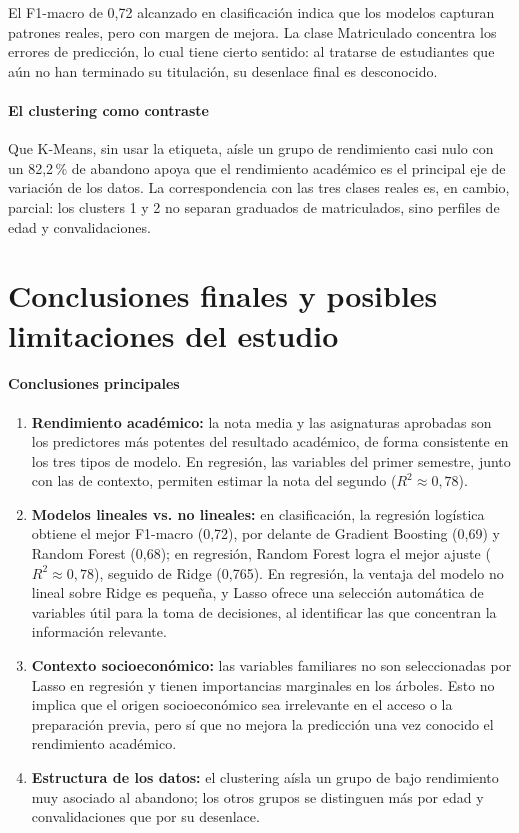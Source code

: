 \documentclass[11pt,letterpaper]{article}
\begin{document}
El F1-macro de 0,72 alcanzado en clasificación indica que los modelos capturan patrones reales, pero con margen de mejora. La clase Matriculado concentra los errores de predicción, lo cual tiene cierto sentido: al tratarse de estudiantes que aún no han terminado su titulación, su desenlace final es desconocido.

\paragraph{El clustering como contraste}
Que K-Means, sin usar la etiqueta, aísle un grupo de rendimiento casi nulo con un 82,2\,\% de abandono apoya que el rendimiento académico es el principal eje de variación de los datos. La correspondencia con las tres clases reales es, en cambio, parcial: los clusters 1 y 2 no separan graduados de matriculados, sino perfiles de edad y convalidaciones.

\section{Conclusiones finales y posibles limitaciones del estudio}

\paragraph{Conclusiones principales}
\begin{enumerate}
\item \textbf{Rendimiento académico:} la nota media y las asignaturas aprobadas son los predictores más potentes del resultado académico, de forma consistente en los tres tipos de modelo. En regresión, las variables del primer semestre, junto con las de contexto, permiten estimar la nota del segundo ($R^2\approx0{,}78$).
\item \textbf{Modelos lineales vs. no lineales:} en clasificación, la regresión logística obtiene el mejor F1-macro (0,72), por delante de Gradient Boosting (0,69) y Random Forest (0,68); en regresión, Random Forest logra el mejor ajuste ($R^2\approx0{,}78$), seguido de Ridge (0,765). En regresión, la ventaja del modelo no lineal sobre Ridge es pequeña, y Lasso ofrece una selección automática de variables útil para la toma de decisiones, al identificar las que concentran la información relevante.
\item \textbf{Contexto socioeconómico:} las variables familiares no son seleccionadas por Lasso en regresión y tienen importancias marginales en los árboles. Esto no implica que el origen socioeconómico sea irrelevante en el acceso o la preparación previa, pero sí que no mejora la predicción una vez conocido el rendimiento académico.
\item \textbf{Estructura de los datos:} el clustering aísla un grupo de bajo rendimiento muy asociado al abandono; los otros grupos se distinguen más por edad y convalidaciones que por su desenlace.
\end{enumerate}
\end{document}
